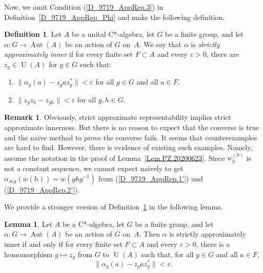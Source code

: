 \documentclass[10pt]{amsart}
\numberwithin{equation}{section}
\theoremstyle{definition}
\newtheorem{lem}[thm]{Lemma}
\newtheorem{dfn}[thm]{Definition}
\newtheorem{rmk}[thm]{Remark}
\newcommand{\af}{\alpha}
\newcommand{\ep}{\varepsilon}
\newcommand{\Aut}{{\operatorname{Aut}}}
\newcommand{\U}{{\operatorname{U}}}
\newcommand{\ca}{C*-algebra}
\newcommand{\hm}{homomorphism}
\renewcommand{\S}{\subset}
\newcommand{\Def}[1]{Definition~\ref{#1}}
\begin{document}
Now, we  omit Condition (\ref{D_9719_AppRep.3}) in \Def{D_9719_AppRep_Phi} and make the following definition.
\begin{dfn}\label{D_9719_StrictAppInn}
Let $A$ be a unital \ca,
let $G$ be a finite group,
and let $\af \colon G \to \Aut (A)$
be an action of $G$ on~$A$.
We say that $\af$ is
{\emph{strictly approximately inner}}
if for every finite set $F \subset A$ and every $\ep > 0$,
there are  $z_g \in \U (A)$ for $g \in G$ such that:
\begin{enumerate}
\item \label{D_9719_StrictAppInn.1}
$\| \af_g (a) - z_g a z_g^* \| < \ep$ for all $g \in G$ and all $a \in F$.
\item \label{D_9719_StrictAppInn.2}
$\| z_g z_h - z_{gh}\| < \ep$ for all $g, h \in G$.
\end{enumerate}
\end{dfn}
%
\begin{rmk}
Obviously, strict approximate representability implies strict approximate innerness.
But there is no reason to expect that the converse is true and the naive method to prove the converse fails.
It seems that counterexamples are hard to find.
However, there is evidence of existing such examples. Namely, assume the notation in the proof of Lemma~\ref{Lem.PZ.20200623}.
Since $w_g^{(0)}$ is not a constant sequence, we cannot expect naively to get $\alpha_{\infty g} (w(h)) = w(g h g^{-1})$ from 
(\ref{D_9719_AppRep.1'}) and (\ref{D_9719_AppRep.2'}).
\end{rmk}
%
We provide a stronger version of Definition~\ref{D_9719_StrictAppInn} in the following lemma.
%
\begin{lem}\label{Lem.s.a.i_hom}
Let $A$ be a \ca,
let $G$ be a finite group,
and let $\af \colon G \to \Aut (A)$
be an action of $G$ on~$A$. Then $\af$ is strictly approximately inner
if and only if
for every finite set $F \S A$ and every $\ep > 0$,
there is a \hm{} $g \mapsto z_g$
from $G$ to $\U (A)$ such that, for all $g \in G$ and all $a \in F$,
\[
\| \af_g (a) - z_g a z_g^* \| < \ep.
\] 
\end{lem}
\end{document}
